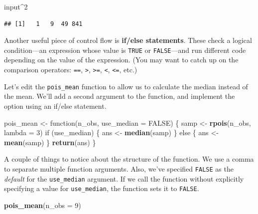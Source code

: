 \documentclass[12pt,oneside,openany]{book}
\newenvironment{Shaded}{\begin{snugshade}}{\end{snugshade}}
\newcommand{\KeywordTok}[1]{\textcolor[rgb]{0.13,0.29,0.53}{\textbf{{#1}}}}
\newcommand{\DataTypeTok}[1]{\textcolor[rgb]{0.13,0.29,0.53}{{#1}}}
\newcommand{\DecValTok}[1]{\textcolor[rgb]{0.00,0.00,0.81}{{#1}}}
\newcommand{\StringTok}[1]{\textcolor[rgb]{0.31,0.60,0.02}{{#1}}}
\newcommand{\OtherTok}[1]{\textcolor[rgb]{0.56,0.35,0.01}{{#1}}}
\newcommand{\NormalTok}[1]{{#1}}
\begin{document}
\begin{Shaded}
\begin{Highlighting}[]
\NormalTok{input^}\DecValTok{2}
\end{Highlighting}
\end{Shaded}

\begin{verbatim}
## [1]   1   9  49 841
\end{verbatim}

Another useful piece of control flow is \textbf{if/else statements}.
These check a logical condition---an expression whose value is
\texttt{TRUE} or \texttt{FALSE}---and run different code depending on
the value of the expression. (You may want to catch up on the comparison
operators: \texttt{==}, \texttt{\textgreater{}},
\texttt{\textgreater{}=}, \texttt{\textless{}}, \texttt{\textless{}=},
etc.)

Let's edit the \texttt{pois\_mean} function to allow us to calculate the
median instead of the mean. We'll add a second argument to the function,
and implement the option using an if/else statement.

\begin{Shaded}
\begin{Highlighting}[]
\NormalTok{pois_mean <-}\StringTok{ }\NormalTok{function(n_obs, }\DataTypeTok{use_median =} \OtherTok{FALSE}\NormalTok{) \{}
  \NormalTok{samp <-}\StringTok{ }\KeywordTok{rpois}\NormalTok{(n_obs, }\DataTypeTok{lambda =} \DecValTok{3}\NormalTok{)}
  \NormalTok{if (use_median) \{}
    \NormalTok{ans <-}\StringTok{ }\KeywordTok{median}\NormalTok{(samp)}
  \NormalTok{\} else \{}
    \NormalTok{ans <-}\StringTok{ }\KeywordTok{mean}\NormalTok{(samp)}
  \NormalTok{\}}
  \KeywordTok{return}\NormalTok{(ans)}
\NormalTok{\}}
\end{Highlighting}
\end{Shaded}

A couple of things to notice about the structure of the function. We use
a comma to separate multiple function arguments. Also, we've specified
\texttt{FALSE} as the \emph{default} for the \texttt{use\_median}
argument. If we call the function without explicitly specifying a value
for \texttt{use\_median}, the function sets it to \texttt{FALSE}.

\begin{Shaded}
\begin{Highlighting}[]
\KeywordTok{pois_mean}\NormalTok{(}\DataTypeTok{n_obs =} \DecValTok{9}\NormalTok{)}
\end{Highlighting}
\end{Shaded}
\end{document}
